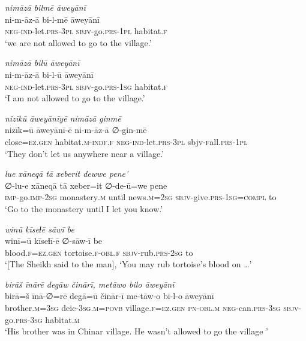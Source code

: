 \ea \label{DG.35}
\textit{nimāzā bilmē āweyānī} \\ 
\gll ni-m-āz-ā bi-l-mē āweyānī \\ 
 \textsc{neg-}\textsc{ind-}let\textsc{.prs}\textsc{-3pl} \textsc{sbjv-}go\textsc{.prs}\textsc{-1pl} habitat\textsc{\textsc{.f}} \\ 
\glt `we are not allowed to go to the village.'
\z 
 
\ea \label{DG.39}
\textit{nimāzā bilū āweyānī} \\ 
\gll ni-m-āz-ā bi-l-ū āweyānī \\ 
 \textsc{neg-}\textsc{ind-}let\textsc{.prs}\textsc{-3pl} \textsc{sbjv-}go\textsc{.prs}\textsc{-1sg} habitat\textsc{\textsc{.f}} \\ 
\glt `I am not allowed to go to the village.'
\z 
 
\ea \label{DG.42}
\textit{nizīkū āweyānīyē nimāzā ginmē} \\ 
\gll nizīk=ū āweyānī-ē ni-m-āz-ā ∅-gin-mē \\ 
 close\textsc{=ez}\textsc{.gen} habitat\textsc{\textsc{.m}}\textsc{-indf}\textsc{\textsc{.f}} \textsc{neg-}\textsc{ind-}let\textsc{.prs}\textsc{-3pl} sbjv\textsc{-f}all\textsc{.prs}\textsc{-1pl} \\ 
\glt `They don’t let us anywhere near a village.'
\z 
 
\ea \label{DG.45}
\textit{lue xāneqā tā xeberit dewwe pene’} \\ 
\gll ∅-lu-e xāneqā tā xeber=it ∅-de-ū=we pene \\ 
 \textsc{imp-}go.\textsc{imp-}\textsc{2sg} monastery\textsc{.m} until news\textsc{.m}\textsc{=\textsc{2sg}} \textsc{sbjv-}give\textsc{.prs}\textsc{-1sg}\textsc{=\textsc{compl}} to \\ 
\glt `Go to the monastery until I let you know.'
\z 
 
\ea \label{DG.47}
\textit{winū kīseɫē sāwī be} \\ 
\gll winī=ū kīseɫī-ē ∅-sāw-ī be \\ 
 blood\textsc{\textsc{.f}}\textsc{=ez}\textsc{.gen} tortoise\textsc{\textsc{.f}}\textsc{-obl}\textsc{\textsc{.f}} \textsc{sbjv-}rub\textsc{.prs}-\textsc{2sg} to \\ 
\glt `[The Sheikh said to the man], ‘You may rub tortoise’s blood on …'
\z 
 
\ea \label{DG.54}
\textit{birāš īnārē degāw činārī, metāwo bilo āweyānī} \\ 
\gll birā=š īnā-∅=rē degā=ū činār-ī me-tāw-o bi-l-o āweyānī \\ 
 brother\textsc{.m}\textsc{=3sg} deic\textsc{-3sg}\textsc{.m}\textsc{=\textsc{povb}} village\textsc{\textsc{.f}}\textsc{=ez}\textsc{.gen} \textsc{pn}\textsc{-obl}\textsc{.m} \textsc{neg-}can\textsc{.prs}\textsc{-3sg} \textsc{sbjv-}go\textsc{.prs}\textsc{-3sg} habitat\textsc{\textsc{.m}} \\ 
\glt `His brother was in Chinar village. He wasn’t allowed to go the village '
\z 
 
